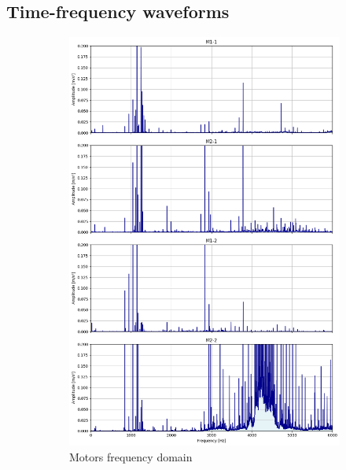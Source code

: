 \subsection{Time-frequency waveforms}
\begin{figure}[h]
    \centering
    \begin{subfigure}[b]{0.33\textwidth}
        \includegraphics[width=\textwidth]{assets/results/eda/frequency-spectrum-motors.png}
        \caption{Motors frequency domain}
    \end{subfigure}
    \hfill
    \begin{subfigure}[b]{0.33\textwidth}

\end{subfigure}
\end{figure}
